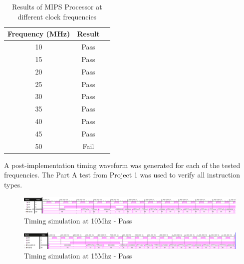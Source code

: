 \documentclass[CMPE]{../KGCOEReport}
\newcommand{\pass}{\cellcolor{green}Pass}
\newcommand{\fail}{\cellcolor{red}Fail}
\begin{document}
    \begin{table}[H]
        \renewcommand{\arraystretch}{1.2}
        \setlength{\tabcolsep}{12pt}
        \caption{Results of MIPS Processor at different clock frequencies}
        \begin{center}
            \begin{tabular}{|c|c|c|}
                \hline
				Frequency (MHz) & Result\\\hline
   
				10 & \pass\\\hline
				15 & \pass\\\hline
				20 & \pass\\\hline
				25 & \pass\\\hline
				30 & \pass\\\hline
				35 & \pass\\\hline
				40 & \pass\\\hline
				45 & \pass\\\hline
				50 & \fail\\\hline

            \end{tabular}
        \end{center}
        \label{tab:inputs}
    \end{table}
    
    A post-implementation timing waveform was generated for each of the
    tested frequencies. The Part A test from Project 1 was used to verify
    all instruction types.
    
	\begin{figure}[h!]
        \centering
        \includegraphics[width=\textwidth]{img/impl_10Mhz}
        \caption{Timing simulation at 10Mhz - Pass}
        \label{fig:demo1}
	\end{figure}
    
	\begin{figure}[h!]
        \centering
        \includegraphics[width=\textwidth]{img/impl_15Mhz}
        \caption{Timing simulation at 15Mhz - Pass}
        \label{fig:demo1}
	\end{figure}
    
\end{document}
